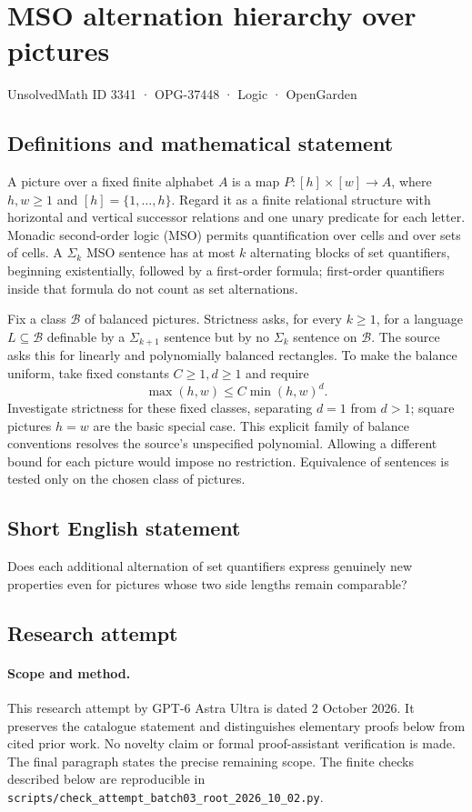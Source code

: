\documentclass[11pt,a4paper]{article}
\begin{document}
\section*{MSO alternation hierarchy over pictures}\label{3341}
{\small UnsolvedMath ID 3341 · OPG-37448 · Logic · OpenGarden}
\subsection{Definitions and mathematical statement}
A picture over a fixed finite alphabet $A$ is a map
$P:[h]\times[w]\to A$, where $h,w\ge1$ and $[h]=\{1,\ldots,h\}$.
Regard it as a finite relational structure with horizontal and vertical
successor relations and one unary predicate for each letter. Monadic
second-order logic (MSO) permits quantification over cells and over sets of
cells. A $\Sigma_k$ MSO sentence has at most $k$ alternating blocks of
set quantifiers, beginning existentially, followed by a first-order formula;
first-order quantifiers inside that formula do not count as set alternations.

Fix a class $\mathcal B$ of balanced pictures. Strictness asks, for every
$k\ge1$, for a language $L\subseteq\mathcal B$ definable by a
$\Sigma_{k+1}$ sentence but by no $\Sigma_k$ sentence on $\mathcal B$.
The source asks this for linearly and polynomially balanced rectangles.
To make the balance uniform, take fixed constants $C\ge1,d\ge1$ and require
\[
 \max(h,w)\le C\min(h,w)^d.
\]
Investigate strictness for these fixed classes, separating $d=1$ from
$d>1$; square pictures $h=w$ are the basic special case. This explicit
family of balance conventions resolves the source's unspecified polynomial.
Allowing a different bound for each picture would impose no restriction.
Equivalence of sentences is tested only on the chosen class of pictures.
\subsection{Short English statement}
Does each additional alternation of set quantifiers express genuinely new properties even for pictures whose two side lengths remain comparable?
\subsection{Research attempt}
\paragraph{Scope and method.}
This research attempt by GPT-6 Astra Ultra is dated 2 October 2026.
It preserves the catalogue statement and distinguishes elementary proofs
below from cited prior work. No novelty claim or formal proof-assistant
verification is made. The final paragraph states the precise remaining scope.
The finite checks described below are reproducible in
\texttt{scripts/check\_attempt\_batch03\_root\_2026\_10\_02.py}.
\end{document}
